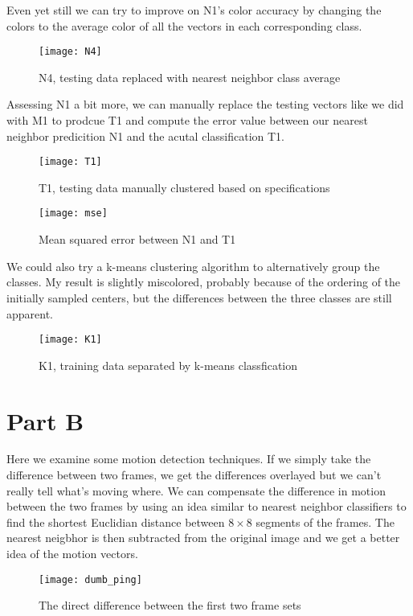 \documentclass[12pt]{article}
\begin{document}
Even yet still we can try to improve on N1's color accuracy by changing the
colors to the average color of all the vectors in each corresponding class.

\begin{figure}[H]
  \centering
  \texttt{[image: N4]}
  \caption{N4, testing data replaced with nearest neighbor class average}
\end{figure}

Assessing N1 a bit more, we can manually replace the testing vectors like we did
with M1 to prodcue T1 and compute the error value between our nearest neighbor
predicition N1 and the acutal classification T1.

\begin{figure}[H]
  \centering
  \texttt{[image: T1]}
  \caption{T1, testing data manually clustered based on specifications}
\end{figure}

\begin{figure}[H]
  \centering
  \texttt{[image: mse]}
  \caption{Mean squared error between N1 and T1}
\end{figure}

We could also try a k-means clustering algorithm to alternatively group the
classes. My result is slightly miscolored, probably because of the ordering of
the initially sampled centers, but the differences between the three classes are
still apparent.

\begin{figure}[H]
  \centering
  \texttt{[image: K1]}
  \caption{K1, training data separated by k-means classfication}
\end{figure}

\section{Part B}

Here we examine some motion detection techniques. If we simply take the
difference between two frames, we get the differences overlayed but we can't
really tell what's moving where. We can compensate the difference in motion
between the two frames by using an idea similar to nearest neighbor classifiers
to find the shortest Euclidian distance between $8\times8$ segments of the frames.
The nearest neigbhor is then subtracted from the original image and we get a
better idea of the motion vectors.

\begin{figure}[H]
  \centering
  \texttt{[image: dumb\_ping]}
  \caption{The direct difference between the first two frame sets}
\end{figure}
\end{document}
